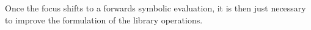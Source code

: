 \documentclass{llncs}
\begin{document}
Once the focus shifts to a forwards symbolic evaluation, it is then just necessary to improve the formulation of the library operations.









\end{document}
